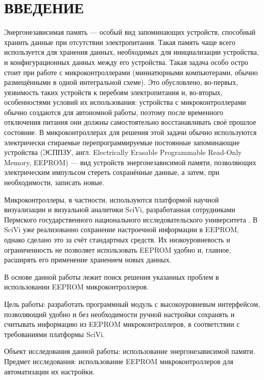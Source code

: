 \chapter*{ВВЕДЕНИЕ}

Энергонезависимая память --- особый вид запоминающих устройств, способный хранить данные при отсутствии электропитания.
Такая память чаще всего используется для хранения данных, необходимых для инициализации устройства, и конфигурационных данных между его устройства.
Такая задача особо остро стоит при работе с микроконтроллерами (миниатюрными компьютерами, обычно размещёнными в одной интегральной схеме). Это обусловлено, во-первых, уязвимость таких устройств к перебоям электропитания и, во-вторых, особенностями условий их использования: устройства с микроконтроллерами обычно создаются для автономной работы, поэтому после временного отключения питания они должны самостоятельно восстанавливать своё прошлое состояние.
В микроконтроллерах для решения этой задачи обычно используются электрически стираемые перепрограммируемые постоянные запоминающие устройства (ЭСППЗУ, англ. Electrically Erasable Programmable Read-Only Memory, EEPROM) --- вид устройств энергонезависимой памяти, позволяющих электрическим импульсом стереть сохранённые данные, а затем, при необходимости, записать новые.

Микроконтроллеры, в частности, используются платформой научной визуализации и визуальной аналитики SciVi, разработанная сотрудниками Пермского государственного национального исследовательского университета \cite{article:scivi}. 
В SciVi уже реализованно сохранение настроечной информации в EEPROM, однако сделано это за счёт стандартных средств. Их низкоуровневость и ограниченность не позволяет использовать EEPROM удобно и, главное, расширять его применение хранением новых данных.

В основе данной работы лежит поиск решения указанных проблем в использовании EEPROM микроконтроллеров.

Цель работы: разработать программный модуль с высокоуровневым интерфейсом, позволяющий удобно и без необходимости ручной настройки сохранять и считывать информацию из EEPROM микроконтроллеров, в соответствии с требованиями платформы SciVi.

Объект исследования данной работы: использование энергонезависимой памяти.
Предмет исследования: использование EEPROM микроконтроллеров для автоматизации их настройки.

